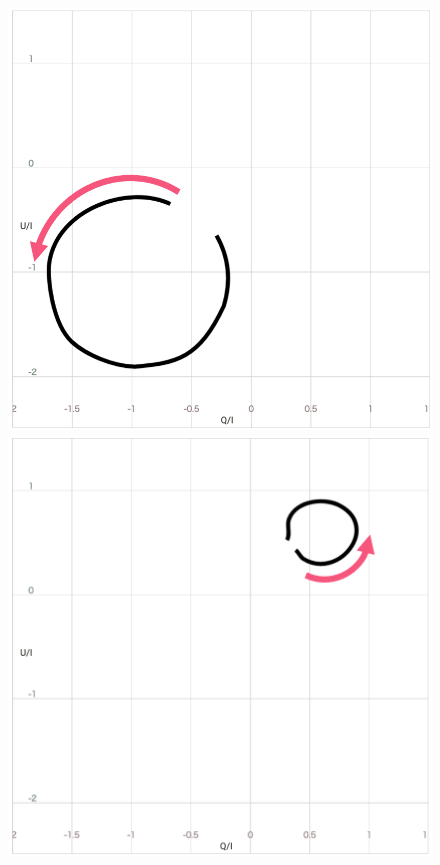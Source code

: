 \begin{figure}[tb]
    \centering
    \begin{minipage}{0.49\linewidth}
        \centering
        \includegraphics[width=.9\linewidth]{vgtc_journal_latex/figures/QBSSketchwithoutWidth.png}
    \end{minipage}
    \begin{minipage}{0.49\linewidth}
        \centering
        \includegraphics[width=.9\linewidth]{vgtc_journal_latex/figures/QBSResultQuerywithoutWidth.png}

\end{minipage}
\end{figure}
